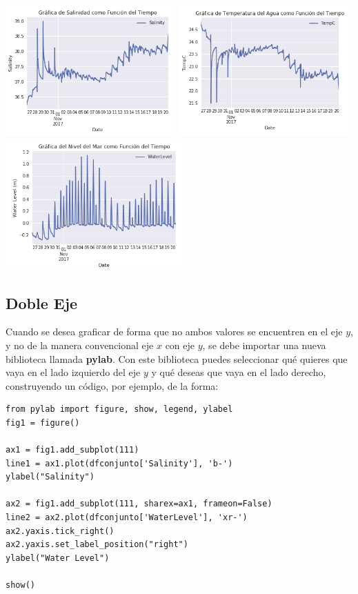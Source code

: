 \documentclass{article}
\begin{document}
	\begin{center}
    \includegraphics[height=5cm]{lineal1.png}
    \includegraphics[height=5cm]{lineal2.png}
    \includegraphics[height=5cm]{lineal3.png}
    \end{center}

\subsection{Doble Eje}
Cuando se desea graficar de forma que no ambos valores se encuentren en el eje $y$, y no de la manera convencional eje $x$ con eje $y$, se debe importar una nueva biblioteca llamada \textbf{pylab}. Con este biblioteca puedes seleccionar qué quieres que vaya en el lado izquierdo del eje $y$ y qué deseas que vaya en el lado derecho, construyendo un código, por ejemplo, de la forma:

\begin{verbatim}
from pylab import figure, show, legend, ylabel
fig1 = figure()

ax1 = fig1.add_subplot(111)
line1 = ax1.plot(dfconjunto['Salinity'], 'b-')
ylabel("Salinity")

ax2 = fig1.add_subplot(111, sharex=ax1, frameon=False)
line2 = ax2.plot(dfconjunto['WaterLevel'], 'xr-')
ax2.yaxis.tick_right()
ax2.yaxis.set_label_position("right")
ylabel("Water Level")

show()
\end{verbatim}
\end{document}
